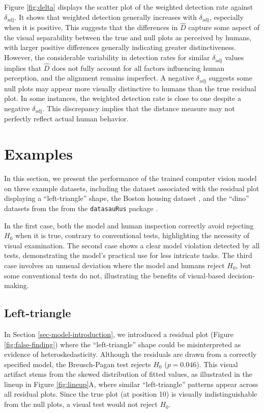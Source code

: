 \documentclass[]{interact}
\theoremstyle{plain}%
\theoremstyle{definition}
\theoremstyle{remark}
\begin{document}
Figure \ref{fig:delta} displays the scatter plot of the weighted
detection rate against \(\delta_{\text{adj}}\). It shows that weighted
detection generally increases with \(\delta_{\text{adj}}\), especially
when it is positive. This suggests that the differences in \(\hat{D}\)
capture some aspect of the visual separability between the true and null
plots as perceived by humans, with larger positive differences generally
indicating greater distinctiveness. However, the considerable
variability in detection rates for similar \(\delta_{\text{adj}}\)
values implies that \(\hat{D}\) does not fully account for all factors
influencing human perception, and the alignment remains imperfect. A
negative \(\delta_{\text{adj}}\) suggests some null plots may appear
more visually distinctive to humans than the true residual plot. In some
instances, the weighted detection rate is close to one despite a
negative \(\delta_{\text{adj}}\). This discrepancy implies that the
distance measure may not perfectly reflect actual human behavior.

\section{Examples}\label{sec-examples}

In this section, we present the performance of the trained computer
vision model on three example datasets, including the dataset associated
with the residual plot displaying a ``left-triangle'' shape, the Boston
housing dataset \citep{harrison1978hedonic}, and the ``dino'' datasets
from the from the \texttt{datasauRus} package \citep{datasaurus}.

In the first case, both the model and human inspection correctly avoid
rejecting \(H_0\) when it is true, contrary to conventional tests,
highlighting the necessity of visual examination. The second case shows
a clear model violation detected by all tests, demonstrating the model's
practical use for less intricate tasks. The third case involves an
unusual deviation where the model and humans reject \(H_0\), but some
conventional tests do not, illustrating the benefits of visual-based
decision-making.

\subsection{Left-triangle}\label{left-triangle}

In Section \ref{sec-model-introduction}, we introduced a residual plot
(Figure \ref{fig:false-finding}) where the ``left-triangle'' shape could
be misinterpreted as evidence of heteroskedasticity. Although the
residuals are drawn from a correctly specified model, the Breusch-Pagan
test rejects \(H_0\) (\(p = 0.046\)). This visual artifact stems from
the skewed distribution of fitted values, as illustrated in the lineup
in Figure \ref{fig:lineup}A, where similar ``left-triangle'' patterns
appear across all residual plots. Since the true plot (at position 10)
is visually indistinguishable from the null plots, a visual test would
not reject \(H_0\).
\end{document}
